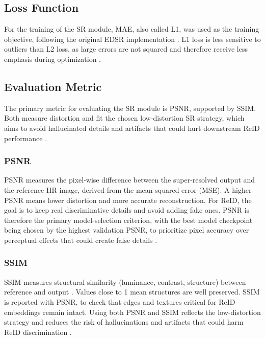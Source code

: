 \subsection{Loss Function}\label{sec:srloss}
For the training of the \acs{SR} module, \acf{MAE}, also called \acf{L1}, was used as the training objective, following the original \acs{EDSR} implementation \cite{lim2017edsr}. \acs{L1} loss is less sensitive to outliers than \acs{L2} loss, as large errors are not squared and therefore receive less emphasis during optimization \cite{Goodfellow2016}.

\subsection{Evaluation Metric}
The primary metric for evaluating the \acs{SR} module is \acf{PSNR}, supported by \acf{SSIM}. Both measure distortion and fit the chosen low-distortion \acs{SR} strategy, which aims to avoid hallucinated details and artifacts that could hurt downstream \acs{ReID} performance \cite{Blau2018PerceptionDistortion}.

\subsubsection*{PSNR}
\acs{PSNR} measures the pixel-wise difference between the super-resolved output and the reference \acs{HR} image, derived from the mean squared error (MSE). A higher \acs{PSNR} means lower distortion and more accurate reconstruction. For \acs{ReID}, the goal is to keep real discriminative details and avoid adding fake ones. \acs{PSNR} is therefore the primary model-selection criterion, with the best model checkpoint being chosen by the highest validation \acs{PSNR}, to prioritize pixel accuracy over perceptual effects that could create false details \cite{lim2017edsr}.

\subsubsection*{SSIM}
\acs{SSIM} measures structural similarity (luminance, contrast, structure) between reference and output \cite{Wang2004SSIM}. Values close to 1 mean structures are well preserved. \acs{SSIM} is reported with \acs{PSNR}, to check that edges and textures critical for \acs{ReID} embeddings remain intact. Using both \acs{PSNR} and \acs{SSIM} reflects the low-distortion strategy and reduces the risk of hallucinations and artifacts that could harm \acs{ReID} discrimination \cite{Blau2018PerceptionDistortion}.

